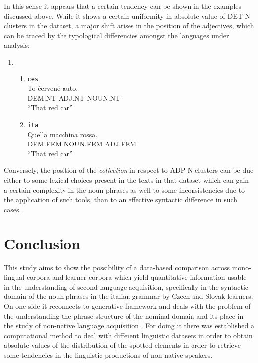 \documentclass[a4paper,twoside,12pt,chapterprefix=false,listof=flat]{scrartcl}
\providecommand{\tightlist}{%
  \setlength{\itemsep}{0pt}\setlength{\parskip}{0pt}}
\theoremstyle{plain} %
\theoremstyle{definition}
\theoremstyle{remark}
\begin{document}
In this sense it appears that a certain tendency can be shown in the
examples discussed above. While it shows a certain uniformity in
absolute value of DET-N clusters in the dataset, a major shift arises in
the position of the adjectives, which can be traced by the typological
differencies amongst the languages under analysis:

\begin{enumerate}
\def\labelenumi{(\arabic{enumi})}
\setcounter{enumi}{3}
\item
  \begin{enumerate}
  \def\labelenumii{\alph{enumii}.}
  \tightlist
  \item
    \texttt{ces} \label{exm:adjCes}\\
    \gll    To červené auto.\\
    DEM.NT ADJ.NT NOUN.NT\\
    \glt    \enquote{That red car}
  \item
    \texttt{ita} \label{exm:adjIta}\\
    \gll    Quella macchina rossa.\\
    DEM.FEM NOUN.FEM ADJ.FEM\\
    \glt    \enquote{That red car}
  \end{enumerate}
\end{enumerate}

Conversely, the position of the \emph{collection} in respect to ADP-N
clusters can be due either to some lexical choices present in the texts
in that dataset which can gain a certain complexity in the noun phrases
as well to some inconsistencies due to the application of such tools,
than to an effective syntactic difference in such cases.

\hypertarget{sec:concl}{%
\section{Conclusion}\label{sec:concl}}

This study aims to show the possibility of a data-based comparison
across mono-lingual corpora and learner corpora which yield quantitative
information usable in the understanding of second language acquisition,
specifically in the syntactic domain of the noun phrases in the italian
grammar by Czech and Slovak learners. On one side it reconnects to
generative framework and deals with the problem of the understanding the
phrase structure of the nominal domain \citep[\citet{bernstein2008},
\citet{zamparelli1995}]{abney1987} and its place in the study of
non-native language acquisition \citep{rothmanslabakova2017}. For doing
it there was established a computational method to deal with different
linguistic datasets \citep{sinclair2005} in order to obtain absolute
values of the distribution of the spotted elements in order to retrieve
some tendencies in the linguistic productions of non-native speakers.
\end{document}
